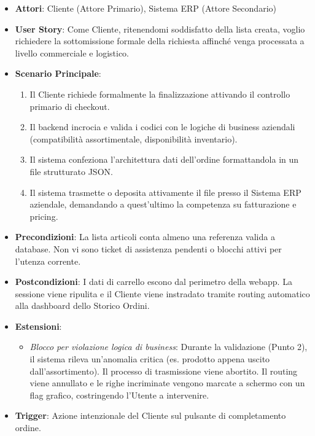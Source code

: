 \begin{itemize}
    \item \textbf{Attori}: Cliente (Attore Primario), Sistema ERP (Attore Secondario)
    \item \textbf{User Story}: Come Cliente, ritenendomi soddisfatto della lista creata, voglio richiedere la sottomissione formale della richiesta affinché venga processata a livello commerciale e logistico.
    \item \textbf{Scenario Principale}: 
    \begin{enumerate}
        \item Il Cliente richiede formalmente la finalizzazione attivando il controllo primario di checkout.
        \item Il backend incrocia e valida i codici con le logiche di business aziendali (compatibilità assortimentale, disponibilità inventario).
        \item Il sistema confeziona l'architettura dati dell'ordine formattandola in un file strutturato JSON.
        \item Il sistema trasmette o deposita attivamente il file presso il Sistema ERP aziendale, demandando a quest'ultimo la competenza su fatturazione e pricing.
    \end{enumerate}
    \item \textbf{Precondizioni}: La lista articoli conta almeno una referenza valida a database. Non vi sono ticket di assistenza pendenti o blocchi attivi per l'utenza corrente.
    \item \textbf{Postcondizioni}: I dati di carrello escono dal perimetro della webapp. La sessione viene ripulita e il Cliente viene instradato tramite routing automatico alla dashboard dello Storico Ordini.
    \item \textbf{Estensioni}:
    \begin{itemize}
        \item \textit{Blocco per violazione logica di business}: Durante la validazione (Punto 2), il sistema rileva un'anomalia critica (es. prodotto appena uscito dall'assortimento). Il processo di trasmissione viene abortito. Il routing viene annullato e le righe incriminate vengono marcate a schermo con un flag grafico, costringendo l'Utente a intervenire.
    \end{itemize}
    \item \textbf{Trigger}: Azione intenzionale del Cliente sul pulsante di completamento ordine.
\end{itemize}

